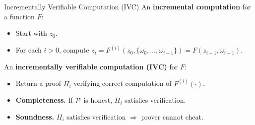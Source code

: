 \begin{frame}{Incrementally Verifiable Computation (IVC)}
	An \textbf{incremental computation} for a function $F$:
	\begin{itemize}
		\item Start with $z_0$.
		\item For each $i > 0$, compute $z_i = F^{(i)}(z_0, \{\omega_0, \dots, \omega_{i - 1}\}) = F(z_{i - 1}, \omega_{i - 1})$.
	\end{itemize}

	An \textbf{incrementally verifiable computation (IVC)} for $F$:
	\begin{itemize}
		\item Return a proof $\Pi_i$ verifying correct computation of $F^{(i)}(\cdot)$.
		\item \textbf{Completeness.} If $\mathcal{P}$ is honest, $\Pi_i$ satisfies verification.
		\item \textbf{Soundness.} $\Pi_i$ satisfies verification $\Rightarrow$ prover cannot cheat.
	\end{itemize}
\end{frame}
